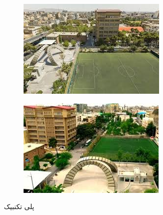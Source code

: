  \begin{figure}[ht]
		\centering %
		\begin{subfigure}{0.45\textwidth}
			\includegraphics[width=\linewidth, height=0.2\textheight]{Images/Chapter6/test5.jpg}
			\caption{}
			\label{f64}
		\end{subfigure}\hfil %
		\begin{subfigure}{0.45\textwidth}
			\includegraphics[width=\linewidth, height=0.2\textheight]{Images/Chapter6/test6.jpg}
			\caption{}
			\label{f65}
		\end{subfigure}
		\caption{پلی تکنبیک}
		\label{fig:fig2}
\end{figure}
